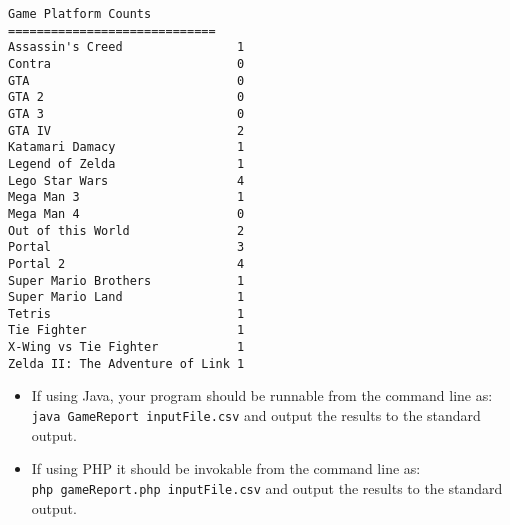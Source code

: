 \documentclass[12pt]{exam}
\begin{document}
\begin{questions}
\begin{verbatim}
Game Platform Counts
=============================
Assassin's Creed                1 
Contra                          0 
GTA                             0 
GTA 2                           0 
GTA 3                           0 
GTA IV                          2 
Katamari Damacy                 1 
Legend of Zelda                 1 
Lego Star Wars                  4 
Mega Man 3                      1 
Mega Man 4                      0 
Out of this World               2 
Portal                          3 
Portal 2                        4 
Super Mario Brothers            1 
Super Mario Land                1 
Tetris                          1 
Tie Fighter                     1 
X-Wing vs Tie Fighter           1 
Zelda II: The Adventure of Link 1 
\end{verbatim}

\begin{itemize}
  \item If using Java, your program should be runnable from the command 
    line as:\\
	\texttt{java GameReport inputFile.csv}
	and output the results to the standard output.
  \item If using PHP it should be invokable from the command line as:\\
	\texttt{php gameReport.php inputFile.csv}
	and output the results to the standard output.
\end{itemize}


\end{questions}
\end{document}
